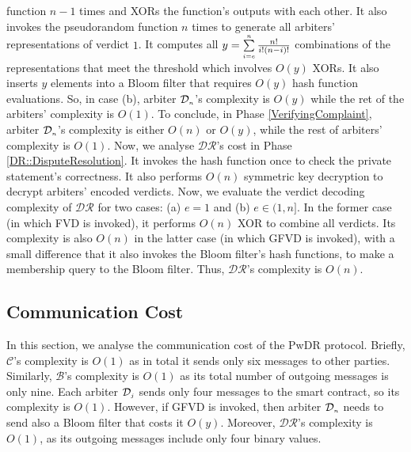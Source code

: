 function $n-1$ times and XORs the function's outputs with each other. It also invokes  the pseudorandom function $n$ times to generate all arbiters' representations of verdict $1$. It computes all $y=\sum\limits_{\scriptscriptstyle i=e}^{\scriptscriptstyle n}\frac{n!}{i!(n- i)!}$ combinations of the representations that meet the threshold which involves $O(y)$ XORs. It also inserts $y$ elements into a Bloom filter that requires  $O(y)$ hash function evaluations. So, in case (b), arbiter $\mathcal{D}_{\scriptscriptstyle n}$'s complexity is $O(y)$ while the ret of the arbiters' complexity is $O(1)$. To conclude, in Phase \ref{VerifyingComplaint},  arbiter $\mathcal{D}_{\scriptscriptstyle n}$'s complexity is either $O(n)$ or $O(y)$, while the rest of arbiters' complexity is $O(1)$. Now, we analyse $\mathcal{DR}$'s cost in Phase \ref{DR::DisputeResolution}. It invokes the hash function once to check the private statement's correctness. It also performs $O(n)$ symmetric key decryption to decrypt arbiters' encoded verdicts. Now, we evaluate the verdict decoding complexity of $\mathcal{DR}$ 
for two cases: (a) $e = 1$ and (b) $e \in (1, n]$. In the former case (in which  FVD is invoked), it performs $O(n)$ XOR to combine all verdicts. Its complexity is also $O(n)$ in the latter case (in which  GFVD is invoked), with a small difference that it also invokes the Bloom filter's hash functions, to make a membership query to the Bloom filter.  Thus, $\mathcal{DR}$'s complexity is $O(n)$. 



\subsection{Communication Cost} In this section, we analyse the communication cost of the PwDR protocol. Briefly, $\mathcal{C}$'s complexity is $O(1)$ as in total it sends only six messages to other parties. Similarly, $\mathcal{B}$'s complexity is $O(1)$ as its total number of outgoing messages is only nine. Each arbiter $\mathcal{D}_{\scriptscriptstyle j}$ sends only four messages to the smart contract, so its complexity is $O(1)$. However, if GFVD is invoked, then arbiter $\mathcal{D}_{\scriptscriptstyle n}$ needs to send also a Bloom filter that costs it $O(y)$. Moreover, $\mathcal{DR}$'s complexity is $O(1)$, as its outgoing messages include  only four binary values. 















